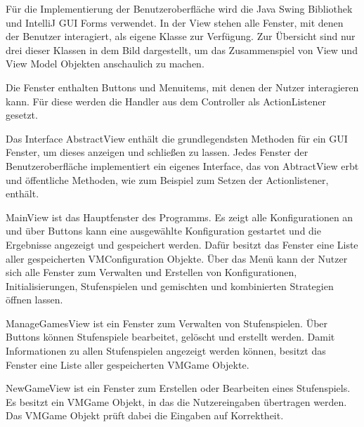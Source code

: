 Für die Implementierung der Benutzeroberfläche wird die Java Swing Bibliothek und IntelliJ GUI Forms verwendet. In der View stehen alle Fenster, mit denen der Benutzer interagiert, als eigene Klasse zur Verfügung. Zur Übersicht sind nur drei dieser Klassen in dem Bild dargestellt, um das Zusammenspiel von View und View Model Objekten anschaulich zu machen. 

Die Fenster enthalten Buttons und Menuitems, mit denen der Nutzer interagieren kann. Für diese werden die Handler aus dem Controller als ActionListener gesetzt. 

Das Interface AbstractView enthält die grundlegendsten Methoden für ein GUI Fenster, um dieses anzeigen und schließen zu lassen. Jedes Fenster der Benutzeroberfläche implementiert ein eigenes Interface, das von AbtractView erbt und öffentliche Methoden, wie zum Beispiel zum Setzen der Actionlistener, enthält. 

MainView ist das Hauptfenster des Programms. Es zeigt alle Konfigurationen an und über Buttons kann eine ausgewählte Konfiguration gestartet und die Ergebnisse angezeigt und gespeichert werden. Dafür besitzt das Fenster eine Liste aller gespeicherten VMConfiguration Objekte.
Über das Menü kann der Nutzer sich alle Fenster zum Verwalten und Erstellen von Konfigurationen, Initialisierungen, Stufenspielen und gemischten und kombinierten Strategien öffnen lassen.

ManageGamesView ist ein Fenster zum Verwalten von Stufenspielen. Über Buttons können Stufenspiele bearbeitet, gelöscht und erstellt werden. Damit Informationen zu allen Stufenspielen angezeigt werden können, besitzt das Fenster eine Liste aller gespeicherten VMGame Objekte.

NewGameView ist ein Fenster zum Erstellen oder Bearbeiten eines Stufenspiels. Es besitzt ein VMGame Objekt, in das die Nutzereingaben übertragen werden. Das VMGame Objekt prüft dabei die Eingaben auf Korrektheit.

